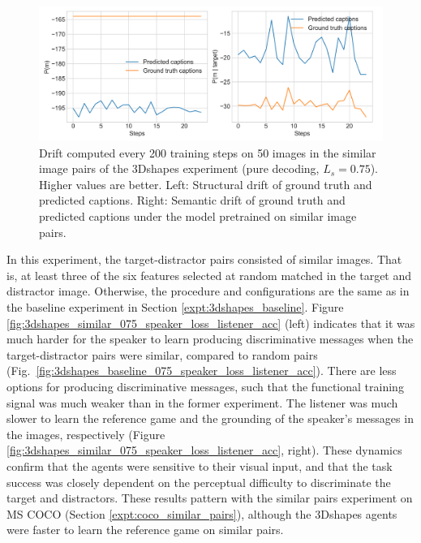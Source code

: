 \begin{figure}[h]
	\centering
	\includegraphics[width=\linewidth]{images/3dshapes_structural_semantic_drift_4000_pure_075_similar.png}
	\caption{Drift computed every 200 training steps on 50 images in the similar image pairs of the 3Dshapes experiment (pure decoding, $L_s = 0.75$). Higher values are better. Left: Structural drift of ground truth and predicted captions. Right: Semantic drift of ground truth and predicted captions under the model pretrained on similar image pairs.} 
	\label{fig:3dshapes_similar_075_str_sem_drift}
\end{figure}

In this experiment, the target-distractor pairs consisted of similar images. That is, at least three of the six features selected at random matched in the target and distractor image. Otherwise, the procedure and configurations are the same as in the baseline experiment in Section \ref{expt:3dshapes_baseline}. 
Figure \ref{fig:3dshapes_similar_075_speaker_loss_listener_acc} (left) indicates that it was much harder for the speaker to learn producing discriminative messages when the target-distractor pairs were similar, compared to random pairs (Fig.~\ref{fig:3dshapes_baseline_075_speaker_loss_listener_acc}). There are less options for producing discriminative messages, such that the functional training signal was much weaker than in the former experiment. The listener was much slower to learn the reference game and the grounding of the speaker's messages in the images, respectively (Figure \ref{fig:3dshapes_similar_075_speaker_loss_listener_acc}, right). These dynamics confirm that the agents were sensitive to their visual input, and that the task success was closely dependent on the perceptual difficulty to discriminate the target and distractors. These results pattern with the similar pairs experiment on MS COCO (Section \ref{expt:coco_similar_pairs}), although the 3Dshapes agents were faster to learn the reference game on similar pairs.

